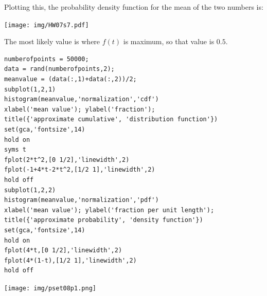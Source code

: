 \documentclass[12pt,letterpaper,noanswers]{exam}
\begin{document}
\begin{questions}
\begin{itemize}
\begin{solution}
Plotting this, the probability density function for the mean of the two numbers is:

\texttt{[image: img/HW07s7.pdf]}

The most likely value is where $f(t)$ is maximum, so that value is $0.5$.
\end{solution}




\begin{solution}
\begin{verbatim}
numberofpoints = 50000;
data = rand(numberofpoints,2);
meanvalue = (data(:,1)+data(:,2))/2;
subplot(1,2,1)
histogram(meanvalue,'normalization','cdf')
xlabel('mean value'); ylabel('fraction');
title({'approximate cumulative', 'distribution function'})
set(gca,'fontsize',14)
hold on
syms t
fplot(2*t^2,[0 1/2],'linewidth',2)
fplot(-1+4*t-2*t^2,[1/2 1],'linewidth',2)
hold off
subplot(1,2,2)
histogram(meanvalue,'normalization','pdf')
xlabel('mean value'); ylabel('fraction per unit length');
title({'approximate probability', 'density function'})
set(gca,'fontsize',14)
hold on
fplot(4*t,[0 1/2],'linewidth',2)
fplot(4*(1-t),[1/2 1],'linewidth',2)
hold off
\end{verbatim}
\texttt{[image: img/pset08p1.png]}
\end{solution}
\end{itemize}



\end{questions}
\end{document}
